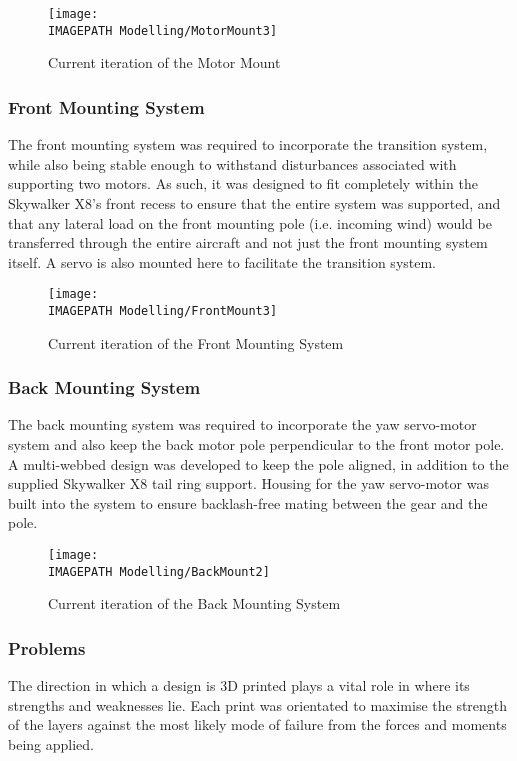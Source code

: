 \begin{figure}[!ht]
	\centering
	\texttt{[image: \\IMAGEPATH Modelling/MotorMount3]}
	\caption{Current iteration of the Motor Mount}
	\label{fig:designmotormount}
\end{figure}
	
\subsubsection*{Front Mounting System}
The front mounting system was required to incorporate the transition system, while also being stable enough to withstand disturbances associated with supporting two motors. As such, it was designed to fit completely within the Skywalker X8's front recess to ensure that the entire system was supported, and that any lateral load on the front mounting pole (i.e. incoming wind) would be transferred through the entire aircraft and not just the front mounting system itself. A servo is also mounted here to facilitate the transition system.

\begin{figure}[!ht]
	\centering
	\texttt{[image: \\IMAGEPATH Modelling/FrontMount3]}
	\caption{Current iteration of the Front Mounting System}
	\label{fig:designfrontmount}
\end{figure}
	
\subsubsection*{Back Mounting System}
The back mounting system was required to incorporate the yaw servo-motor system and also keep the back motor pole perpendicular to the front motor pole. A multi-webbed design was developed to keep the pole aligned, in addition to the supplied Skywalker X8 tail ring support. Housing for the yaw servo-motor was built into the system to ensure backlash-free mating between the gear and the pole.\\

\begin{figure}[!ht]
	\centering
	\texttt{[image: \\IMAGEPATH Modelling/BackMount2]}
	\caption{Current iteration of the Back Mounting System}
	\label{fig:designbackmount}
\end{figure}
		
\subsubsection*{Problems}
The direction in which a design is 3D printed plays a vital role in where its strengths and weaknesses lie. Each print was orientated to maximise the strength of the layers against the most likely mode of failure from the forces and moments being applied.\\

